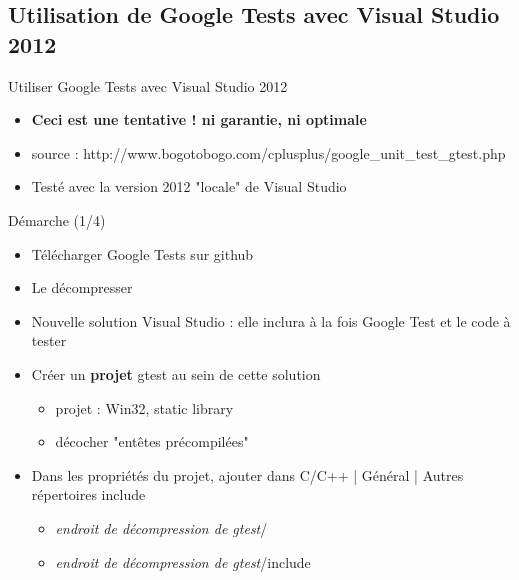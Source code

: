 \subsection{Utilisation de Google Tests avec Visual Studio 2012}

\begin{frame}{Utiliser Google Tests avec Visual Studio 2012}
\begin{itemize}
  \item \textbf{Ceci est une tentative ! ni garantie, ni optimale}
  \item source : http://www.bogotobogo.com/cplusplus/google\_unit\_test\_gtest.php
  \item Testé avec la version 2012 "locale" de Visual Studio
\end{itemize}
\end{frame}


\begin{frame}{Démarche (1/4)}
\begin{itemize}
  \item Télécharger Google Tests sur github
  \item Le décompresser
  \item Nouvelle solution Visual Studio : elle inclura à la fois Google Test et le code à tester
  \item Créer un \textbf{projet} gtest au sein de cette solution
  \begin{itemize}
    \item projet : Win32, static library
    \item décocher "entêtes précompilées"
  \end{itemize}
  \item Dans les propriétés du projet, ajouter dans C/C++ | Général | Autres répertoires include
  \begin{itemize}
    \item \emph{endroit de décompression de gtest}/
    \item \emph{endroit de décompression de gtest}/include
  \end{itemize}
\end{itemize}
\end{frame}

